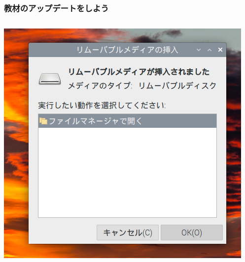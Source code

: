 
\begin{frame}[fragile]
    \frametitle{教材のアップデートをしよう}
    \begin{center}
        \begin{columns}
            \begin{column}{0.48\textwidth}
                \includegraphics[width=\textwidth]{images/slide/insert_removal_media.png}
            \end{column}
            \begin{column}{0.48\textwidth}

\end{column}
\end{columns}
\end{center}
\end{frame}
